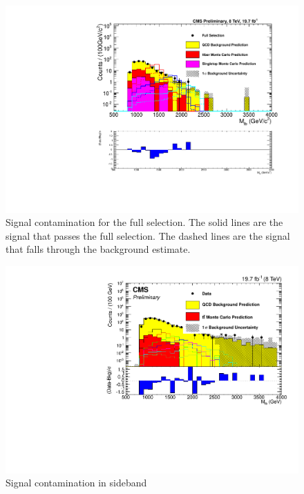 \begin{figure}[Htcb]
\centering
\includegraphics[width=1.0\textwidth]{AN-13-004/figs/sigcontsemilog.pdf}
\caption{Signal contamination for the full selection.  The solid lines are the signal that passes the full selection.  The dashed lines are the signal that falls through the background estimate.}
\label{figs:sigFS}
\end{figure}

\begin{figure}[Htcb]
\centering
\includegraphics[width=1.0\textwidth]{AN-13-004/figs/NewMtbSB2semilogwithsignal.pdf}
\caption{Signal contamination in sideband}
\label{figs:sigSB2}
\end{figure}

